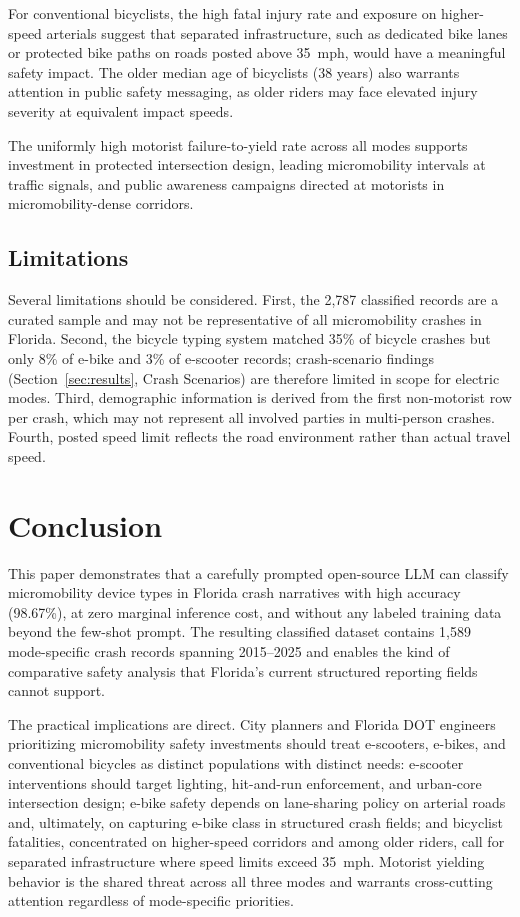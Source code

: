 \documentclass[numbered]{trbunofficial}
\begin{document}
For conventional bicyclists, the high fatal injury rate and exposure on higher-speed arterials suggest that separated infrastructure, such as dedicated bike lanes or protected bike paths on roads posted above 35~mph, would have a meaningful safety impact. The older median age of bicyclists (38 years) also warrants attention in public safety messaging, as older riders may face elevated injury severity at equivalent impact speeds.

The uniformly high motorist failure-to-yield rate across all modes supports investment in protected intersection design, leading micromobility intervals at traffic signals, and public awareness campaigns directed at motorists in micromobility-dense corridors.

\subsection{Limitations}

Several limitations should be considered. First, the 2,787 classified records are a curated sample and may not be representative of all micromobility crashes in Florida. Second, the bicycle typing system matched 35\% of bicycle crashes but only 8\% of e-bike and 3\% of e-scooter records; crash-scenario findings (Section~\ref{sec:results}, Crash Scenarios) are therefore limited in scope for electric modes. Third, demographic information is derived from the first non-motorist row per crash, which may not represent all involved parties in multi-person crashes. Fourth, posted speed limit reflects the road environment rather than actual travel speed.

\section{Conclusion}
\label{sec:conclusion}

This paper demonstrates that a carefully prompted open-source LLM can classify micromobility device types in Florida crash narratives with high accuracy (98.67\%), at zero marginal inference cost, and without any labeled training data beyond the few-shot prompt. The resulting classified dataset contains 1,589 mode-specific crash records spanning 2015--2025 and enables the kind of comparative safety analysis that Florida's current structured reporting fields cannot support.

The practical implications are direct. City planners and Florida DOT engineers prioritizing micromobility safety investments should treat e-scooters, e-bikes, and conventional bicycles as distinct populations with distinct needs: e-scooter interventions should target lighting, hit-and-run enforcement, and urban-core intersection design; e-bike safety depends on lane-sharing policy on arterial roads and, ultimately, on capturing e-bike class in structured crash fields; and bicyclist fatalities, concentrated on higher-speed corridors and among older riders, call for separated infrastructure where speed limits exceed 35~mph. Motorist yielding behavior is the shared threat across all three modes and warrants cross-cutting attention regardless of mode-specific priorities.
\end{document}
